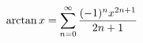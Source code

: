 \documentclass[preview]{standalone}
\begin{document}
\begin{align*}
\special{dvisvgm:raw <g id='unique000'>}\arctan x=\displaystyle\sum_{n=0}^{\infty}\dfrac{(-1)^n x^{2n+1}}{2n+1}\special{dvisvgm:raw </g>}
\end{align*}
\end{document}
